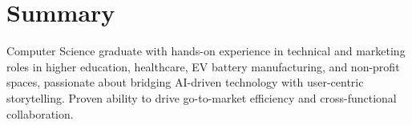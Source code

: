\section{Summary}
    Computer Science graduate with hands-on experience in technical and marketing roles in higher education, healthcare, EV battery manufacturing, and non-profit spaces, passionate about bridging AI-driven technology with user-centric storytelling. Proven ability to drive go-to-market efficiency and cross-functional collaboration.
